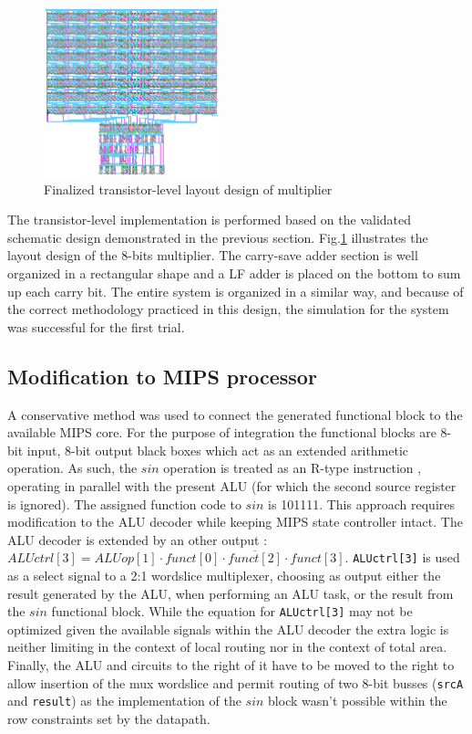 \documentclass[10pt,journal]{IEEEtran}
\begin{document}
\begin{figure}[h]
\centering
\includegraphics[width=2in]{finalized_transistor_design.png}
\caption{Finalized transistor-level layout design of multiplier}
\label{finalized_transistor_design}
\end{figure}

The transistor-level implementation is performed based on the validated schematic design demonstrated in the previous section. Fig.\ref{finalized_transistor_design} illustrates the layout design of the 8-bits multiplier. The carry-save adder section is well organized in a rectangular shape and a LF adder is placed on the bottom to sum up each carry bit. The entire system is organized in a similar way, and because of the correct methodology practiced in this design, the simulation for the system was successful for the first trial.

\subsection{Modification to MIPS processor}
A conservative method was used to connect the generated functional block to the available MIPS core. For the purpose of integration the functional blocks are 8-bit input, 8-bit output black boxes which act as an extended arithmetic operation. As such, the $sin$ operation  is treated as an R-type instruction , operating in parallel with the present ALU (for which the second source register is ignored). The assigned function code to $sin$ is 101111. This approach requires modification to the ALU decoder while keeping MIPS state controller intact. The ALU decoder is extended by an other output : \texttt{$ALUctrl[3] =  ALUop[1] \cdot \overline{funct[0] \cdot funct[2] \cdot funct[3]}$}. \texttt{ALUctrl[3]} is used as a select signal to a 2:1 wordslice multiplexer, choosing as output either the result generated by the ALU, when performing an ALU task, or the result from the $sin$ functional block. While the equation for \texttt{ALUctrl[3]} may not be optimized given the available signals within the ALU decoder the extra logic is neither limiting in the context of local routing nor in the context of total area. Finally, the ALU and circuits to the right of it have to be moved to the right to allow insertion of the mux wordslice and permit routing of two 8-bit busses (\texttt{srcA} and \texttt{result}) as the implementation of the $sin$ block wasn't possible within the row constraints set by the datapath.
\end{document}
